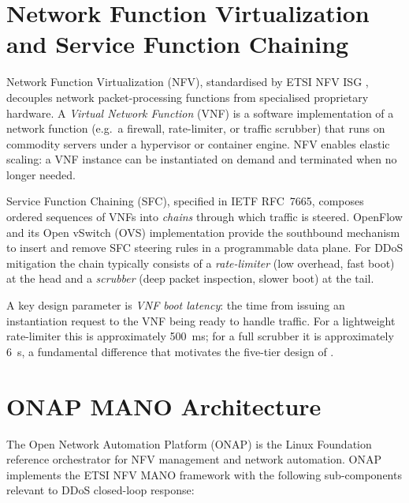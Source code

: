 \section{Network Function Virtualization and Service Function Chaining}
\label{sec:nfv-bg}

Network Function Virtualization (NFV), standardised by ETSI NFV ISG
\citep{etsi_nfv_arch}, decouples network packet-processing functions from
specialised proprietary hardware. A \emph{Virtual Network Function} (VNF)
is a software implementation of a network function (e.g.~a firewall,
rate-limiter, or traffic scrubber) that runs on commodity servers under a
hypervisor or container engine. NFV enables elastic scaling: a VNF instance
can be instantiated on demand and terminated when no longer needed.

Service Function Chaining (SFC), specified in IETF RFC~7665, composes
ordered sequences of VNFs into \emph{chains} through which traffic is
steered. OpenFlow and its Open vSwitch (OVS) implementation provide the
southbound mechanism to insert and remove SFC steering rules in a
programmable data plane. For DDoS mitigation the chain typically consists
of a \emph{rate-limiter} (low overhead, fast boot) at the head and a
\emph{scrubber} (deep packet inspection, slower boot) at the tail.

A key design parameter is \emph{VNF boot latency}: the time from issuing
an instantiation request to the VNF being ready to handle traffic. For a
lightweight rate-limiter this is approximately 500~ms; for a full scrubber
it is approximately 6~s, a fundamental difference that motivates the
five-tier design of \padonap{}.

\section{ONAP MANO Architecture}
\label{sec:onap-bg}

The Open Network Automation Platform (ONAP) is the Linux Foundation
reference orchestrator for NFV management and network automation. ONAP
implements the ETSI NFV MANO framework with the following sub-components
relevant to DDoS closed-loop response:

